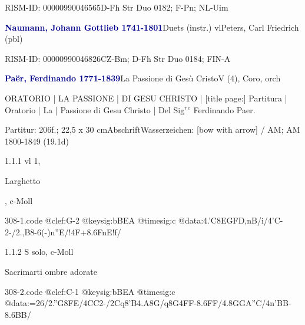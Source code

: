 \documentclass[twocolumn]{book}
\begin{document}
\par RISM-ID: 00000990046565\newline D-Fh  Str Duo 0182; F-Pn; NL-Uim
\par \vspace{7pt} \textcolor{darkblue}{\textbf{Naumann, Johann Gottlieb  1741-1801}}\hfillplus{\textbf{[307]}}\newline Duets (instr.) vl\newline Peters, Carl Friedrich  (pbl)
\par RISM-ID: 00000990046826\newline CZ-Bm; D-Fh  Str Duo 0184; FIN-A
\par \vspace{7pt} \textcolor{darkblue}{\textbf{Paër, Ferdinando  1771-1839}}\hfillplus{\textbf{[308]}}\newline La Passione di Gesù Cristo\newline V (4), Coro, orch
\par \begin{itshape} ORATORIO | LA PASSIONE | DI GESU CHRISTO | [title page:] Partitura | Oratorio | La | Passione di Gesu Christo | Del Sig$^r$$^e$ Ferdinando Paer.\end{itshape} 
\par \textcolor{darkblue}{}  Partitur: 206f.; 22,5 x 30 cm\newline Abschrift\newline Wasserzeichen: [bow with arrow] / AM; AM  1800-1849 (19.1d)
\par 1.1.1  vl 1, \begin{itshape}Larghetto\end{itshape}, c-Moll  
\begin{filecontents*}{308-1.code}
@clef:G-2
@keysig:bBEA
@timesig:c
@data:4.'C8E{GFD,nB}/i/4'C-2-/2.,B8-6(-)n''E/!4F+{8.6FnE}!f/
\end{filecontents*}
\newline
%
\par 1.1.2  S solo, c-Moll\newline \begin{footnotesize} Sacrimarti ombre adorate \end{footnotesize}  
\begin{filecontents*}{308-2.code}
@clef:C-1
@keysig:bBEA
@timesig:c
@data:=26/2.''G{8FE}/4CC2-/2Cq8'B4.A8G/q8G4FF-8.6FF/4.8GGA''C/4n'BB-8.6BB/
\end{filecontents*}
\end{document}
